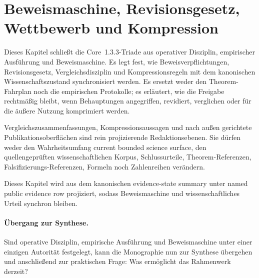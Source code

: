 \section{Beweismaschine, Revisionsgesetz, Wettbewerb und Kompression}
\label{sec:oc-core-1-3-proof-machinery-de}

Dieses Kapitel schließt die Core~1.3.3-Triade aus operativer Disziplin,
empirischer Ausführung und Beweismaschine. Es legt fest, wie
Beweisverpflichtungen, Revisionsgesetz, Vergleichsdisziplin und
Kompressionsregeln mit dem kanonischen Wissenschaftszustand synchronisiert
werden. Es ersetzt weder den Theorem-Fahrplan noch die empirischen
Protokolle; es erläutert, wie die Freigabe rechtmäßig bleibt, wenn Behauptungen
angegriffen, revidiert, verglichen oder für die äußere Nutzung komprimiert
werden.

Vergleichszusammenfassungen, Kompressionsaussagen und nach außen gerichtete
Publikationsoberflächen sind rein projizierende Redaktionsebenen. Sie dürfen
weder den Wahrheitsumfang current bounded science surface, den quellengeprüften
wissenschaftlichen Korpus, Schlussurteile, Theorem-Referenzen,
Falsifizierungs-Referenzen, Formeln noch Zahlenreihen verändern.

Dieses Kapitel wird aus dem kanonischen evidence-state summary
 unter
named public evidence row
projiziert, sodass Beweismaschine und wissenschaftliches Urteil synchron
bleiben.



\paragraph{Übergang zur Synthese.}
Sind operative Disziplin, empirische Ausführung und Beweismaschine unter
einer einzigen Autorität festgelegt, kann die Monographie nun zur Synthese
übergehen und anschließend zur praktischen Frage: Was ermöglicht das
Rahmenwerk derzeit?
